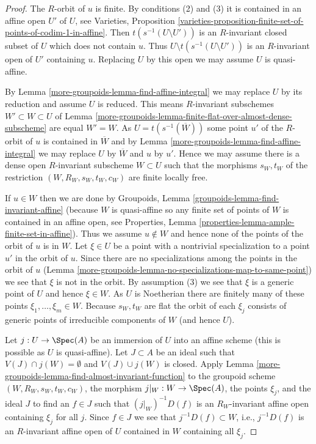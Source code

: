 \begin{proof}
The $R$-orbit of $u$ is finite. By conditions (2) and (3) it is contained
in an affine open $U'$ of $U$, see
Varieties, Proposition
\ref{varieties-proposition-finite-set-of-points-of-codim-1-in-affine}.
Then $t(s^{-1}(U \setminus U'))$ is an $R$-invariant
closed subset of $U$ which does not contain $u$. Thus
$U \setminus t(s^{-1}(U \setminus U'))$ is an $R$-invariant open
of $U'$ containing $u$.
Replacing $U$ by this open we may assume $U$ is quasi-affine.

\medskip\noindent
By Lemma \ref{more-groupoids-lemma-find-affine-integral} we may replace $U$ by its reduction
and assume $U$ is reduced. This means $R$-invariant subschemes
$W' \subset W \subset U$ of
Lemma \ref{more-groupoids-lemma-finite-flat-over-almost-dense-subscheme}
are equal $W' = W$. As $U = t(s^{-1}(\overline{W}))$ some point
$u'$ of the $R$-orbit of $u$ is contained in $\overline{W}$
and by Lemma \ref{more-groupoids-lemma-find-affine-integral}
we may replace $U$ by $\overline{W}$ and $u$ by $u'$.
Hence we may assume there is
a dense open $R$-invariant subscheme $W \subset U$ such that
the morphisms $s_W, t_W$ of the restriction $(W, R_W, s_W, t_W, c_W)$ are
finite locally free.

\medskip\noindent
If $u \in W$ then we are done by
Groupoids, Lemma \ref{groupoids-lemma-find-invariant-affine}
(because $W$ is quasi-affine so any finite set of points
of $W$ is contained in an affine open, see
Properties, Lemma \ref{properties-lemma-ample-finite-set-in-affine}).
Thus we assume $u \not \in W$ and hence none of the points of the
orbit of $u$ is in $W$. Let $\xi \in U$
be a point with a nontrivial specialization to a point $u'$ in the orbit
of $u$. Since there are no specializations among the points in the
orbit of $u$ (Lemma \ref{more-groupoids-lemma-no-specializations-map-to-same-point})
we see that $\xi$ is not in the orbit.
By assumption (3) we see that $\xi$ is a generic point of $U$
and hence $\xi \in W$.
As $U$ is Noetherian there are finitely many of these
points $\xi_1, \ldots, \xi_m \in W$. Because $s_W, t_W$ are flat the orbit
of each $\xi_j$ consists of generic points of irreducible components
of $W$ (and hence $U$).

\medskip\noindent
Let $j : U \to \Spec(A)$ be an immersion of $U$ into an affine scheme
(this is possible as $U$ is quasi-affine). Let $J \subset A$
be an ideal such that $V(J) \cap j(W) = \emptyset$ and $V(J) \cup j(W)$
is closed. Apply Lemma \ref{more-groupoids-lemma-find-almost-invariant-function}
to the groupoid scheme $(W, R_W, s_W, t_W, c_W)$, the morphism
$j|_W : W \to \Spec(A)$, the points $\xi_j$, and the ideal $J$
to find an $f \in J$ such that $(j|_W)^{-1}D(f)$ is an $R_W$-invariant
affine open containing $\xi_j$ for all $j$. Since $f \in J$
we see that $j^{-1}D(f) \subset W$, i.e., $j^{-1}D(f)$ is
an $R$-invariant affine open of $U$ contained in $W$
containing all $\xi_j$.


\end{proof}
